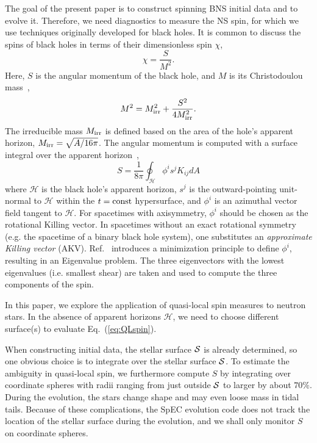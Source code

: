 {The goal of the present paper is to construct spinning BNS initial data and to evolve it.
Therefore, we need diagnostics to measure the NS spin, for which we use techniques originally developed for black holes.
It is common to discuss the spins of black holes in terms of their
dimensionless spin $\chi$,
\begin{equation}\label{eq:chi}
\chi = \frac{S}{M^2}.
\end{equation}
Here, $S$ is the angular momentum of the black hole, and $M$ is its
Christodoulou mass~\cite{Christodoulou70},
\begin{equation}\label{eq:ChristodoulouMass}
M^2 = M_{\rm irr}^2 + \frac{S^2}{4M_{\rm irr}^2}.
\end{equation}
The irreducible mass $M_{\rm irr}$ is defined based on the area of the
hole's apparent horizon, $M_{\rm irr}=\sqrt{A/16\pi}$. The angular
momentum is computed with a surface integral over the apparent
horizon~\cite{BrownYork1993,Ashtekar2001,Ashtekar2003},
\begin{equation}\label{eq:QLspin}
S= \frac{1}{8\pi}\oint_{\mathcal{H}}\phi^is^jK_{ij}dA
\end{equation}
where $\mathcal{H}$ is the black hole's apparent horizon, $s^j$ is the
outward-pointing unit-normal to $\mathcal{H}$ within the $t={\rm const}$
hypersurface, and $\phi^i$ is an azimuthal vector field tangent to
$\mathcal{H}$.  For spacetimes with axisymmetry, $\phi^i$ should be
chosen as the rotational Killing vector.  In spacetimes without an
exact rotational symmetry (e.g. the spacetime of a binary black hole
system), one substitutes an \emph{approximate Killing
  vector}\cite{Cook2007,Lovelace2008} (AKV).  Ref.~\cite{Lovelace2008}
introduces a minimization principle to define $\phi^i$, resulting in
an Eigenvalue problem. The three eigenvectors with the lowest
eigenvalues (i.e. smallest shear) are taken and used to compute
the three components of the spin.

In this paper, we explore the application of quasi-local spin measures
to neutron stars.  In the absence of apparent horizons $\mathcal{H}$,
we need to choose different surface(s) to evaluate Eq.~(\ref{eq:QLspin}). 

When constructing initial data, the stellar surface ${\cal S}$ is
already determined, so one obvious choice is to integrate over the
stellar surface ${\cal S}$.  To estimate the ambiguity in quasi-local
spin, we furthermore compute $S$ by integrating over coordinate
spheres with radii ranging from just outside ${\cal S}$ to larger by
about $70\%$.  During the evolution, the stars change shape and
may even loose mass in tidal tails.  Because of these complications,
the SpEC evolution code does not track the location of the
stellar surface during the evolution, and we shall only
monitor $S$ on coordinate spheres.

}
